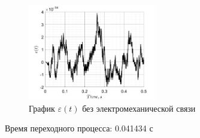 \begin{figure}[!h]
    \centering
    \includegraphics[width=0.5\textwidth]{img/task1_e}
    \caption{График $\varepsilon(t)$ без электромеханической связи}
    \label{fig:task1_e}
\end{figure}

Время переходного процесса: 0.041434 с


